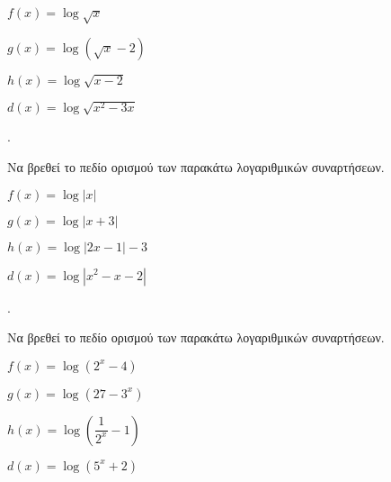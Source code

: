 \documentclass[11pt,a4paper,twocolumn]{article}
\newcounter{askhsh}
\newcommand{\askhsh}{{\large\theaskhsh.}\ \addtocounter{askhsh}{1}}
\begin{document}
\begin{alist}
\item $ f(x)=\log{\sqrt{x}} $
\item $ g(x)=\log{\left( \sqrt{x}-2\right) } $
\item $ h(x)=\log{\sqrt{x-2}} $
\item $ d(x)=\log{\sqrt{x^2-3x} } $
\end{alist}
\askhsh Να βρεθεί το πεδίο ορισμού των παρακάτω λογαριθμικών συναρτήσεων.
\begin{alist}
\item $ f(x)=\log{|x|} $
\item $ g(x)=\log{|x+3| } $
\item $ h(x)=\log{|2x-1|-3} $
\item $ d(x)=\log{\left| x^2-x-2\right|  } $
\end{alist}
\askhsh Να βρεθεί το πεδίο ορισμού των παρακάτω λογαριθμικών συναρτήσεων.
\begin{alist}
\item $ f(x)=\log{\left(2^x-4\right)} $
\item $ g(x)=\log{\left(27-3^x\right)} $
\item $ h(x)=\log{\left(\dfrac{1}{2^x}-1\right)} $
\item $ d(x)=\log{\left(5^x+2\right)} $
\end{alist}
\end{document}
